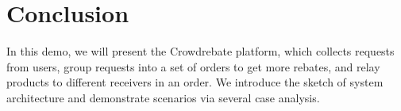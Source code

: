 \section{Conclusion}\vspace{-1ex}
\label{sec:conclusion}

In this demo, we will present the Crowdrebate platform, which collects requests from users, group requests into a set of orders to get more rebates, and relay products to different receivers in an order. We introduce the sketch of system architecture and demonstrate scenarios via several case analysis. 
 
 \vspace{-1.5ex}